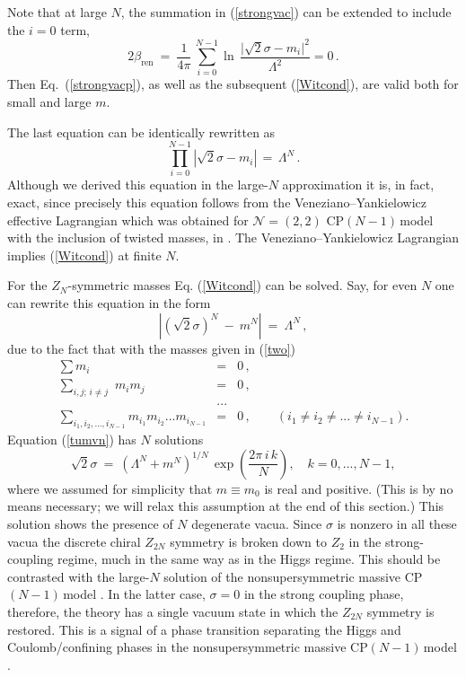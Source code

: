 \documentclass[epsfig,12pt]{article}
\def\beq{\begin{equation}}
\def\eeq{\end{equation}}
\def\beqn{\begin{eqnarray}}
\def\eeqn{\end{eqnarray}}
\newcommand{\cpn}{CP$(N-1)\,$}
\newcommand{\zn}{$Z_N$}
\def\beqn{\begin{eqnarray}}
\def\eeqn{\end{eqnarray}}
\def\beq{\begin{equation}}
\def\eeq{\end{equation}}
\newcommand{\ntwot}{${\mathcal N}= \left(2,2\right) $ }
\newcommand{\bren}{{\beta_\text{ren}}}
\begin{document}
 Note that at large $N$, the summation in (\ref{strongvac}) can be extended to include the
 $i=0$ term,
 \beq
 2\bren~=~\frac{1}{4\pi}\, 
\sum_{i=0}^{N-1}\ln\, {\frac{\bigl|\sqrt{2}\sigma-m_i\bigr|^2}{\Lambda^2}}=0 \,.
\label{strongvacp}
 \eeq
 Then Eq.~(\ref{strongvacp}), as well as 
 the subsequent (\ref{Witcond}), are valid both for small and large $m$.

The last equation can be identically rewritten as 
\beq
\prod_{i=0}^{N-1}\left|\sqrt{2}\sigma-m_i\right| \,=\,\Lambda^N \,.
\label{Witcond}
\eeq
Although we derived this equation in the large-$N$ approximation it is, in fact,
exact, since precisely this equation follows from the
Veneziano--Yankielowicz effective Lagrangian which was obtained for \ntwot \cpn model with the inclusion of twisted masses, 
in  \cite{AdDVecSal,ChVa,W93,HaHo,Dor}. The Veneziano--Yankielowicz  Lagrangian implies (\ref{Witcond})
at finite $N$.

For the \zn-symmetric masses
Eq. (\ref{Witcond}) can be solved. Say, for even $N$ one can rewrite this equation in the form
\beq
\left|\left(\sqrt{2}\sigma\right)^N ~-~ m^N\right| ~=~ \Lambda^N \,,
\label{tumvn}
\eeq
due to the fact that with the masses given in (\ref{two})
\beqn
\sum m_i &=& 0\,,
\nonumber\\[2mm]
\sum_{i,j;\,i\neq j}\,\, m_i m_j &=& 0\,,
\nonumber\\[2mm]
&...&
\nonumber\\[2mm]
\sum_{i_1,i_2,...,i_{N-1}} m_{i_1} m_{i_2} ... m_{i_{N-1}} &=& 0\,,\qquad \left(i_1\neq i_2\neq ...\neq i_{N-1}\right).
\eeqn
Equation (\ref{tumvn})  has $N$ solutions
\beq
\sqrt{2}\sigma ~=~ \left(\Lambda^N+m^N\right)^{1/N}\,
\exp\left( \frac{2\pi\,i\, k}{N}
\right), \quad k=0, ..., N-1,
\label{22sigma}
\eeq
where we assumed for simplicity that $m\equiv m_0$ is real and positive.
(This is by no means necessary; we will relax this assumption at the end of this section.)
This solution shows the presence of $N$ degenerate vacua. Since $\sigma$ is nonzero in all these vacua
the discrete chiral $Z_{2N}$ symmetry is broken down to $Z_2$ in the strong-coupling regime, much in the same way as
in the Higgs regime. This should be contrasted with the large-$N$ solution of the nonsupersymmetric
massive \cpn model \cite{GSYphtr}. In the latter case, $\sigma=0$ in the strong coupling phase, 
therefore, the theory
has   a single vacuum state in which the $Z_{2N}$ symmetry is restored. This is a signal of a phase transition
separating the Higgs and Coulomb/confining phases in the nonsupersymmetric massive \cpn model \cite{GSYphtr}.
\end{document}
